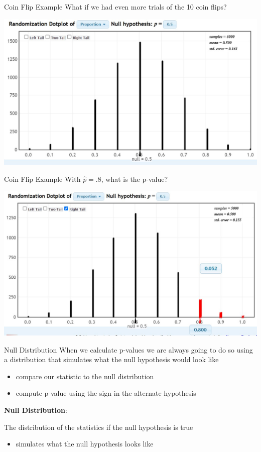 \documentclass{beamer}
\begin{document}
\begin{frame}{Coin Flip Example}
What if we had even more trials of the 10 coin flips?
\begin{center}
    \includegraphics[scale=.6]{img/coin_null_distr.jpg}
\end{center}
\end{frame}

\begin{frame}{Coin Flip Example}
With $\widehat{p} = .8$, what is the p-value?
\begin{center}
    \includegraphics[scale=.6]{img/pvalue2.jpg}
\end{center}
\end{frame}

\begin{frame}{Null Distribution}
When we calculate p-values we are always going to do so using a distribution that simulates what the null hypothesis would look like
\begin{itemize}
    \item compare our statistic to the null distribution
    \item compute p-value using the sign in the alternate hypothesis
\end{itemize} \vspace{8mm}

\textbf{Null Distribution}:

The distribution of the statistics if the null hypothesis is true
\begin{itemize}
    \item simulates what the null hypothesis looks like
\end{itemize} \vspace{8mm}
\end{frame}
\end{document}
